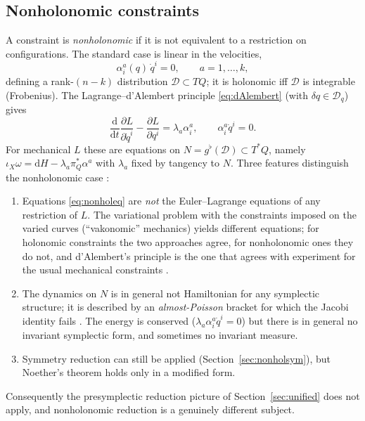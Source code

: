 \documentclass[11pt,a4paper]{article}
\numberwithin{equation}{section}
\theoremstyle{plain}
\theoremstyle{definition}
\theoremstyle{remark}
\newcommand{\dd}{\mathrm{d}}
\begin{document}
\subsection{Nonholonomic constraints}\label{sec:nonhol}

A constraint is \emph{nonholonomic} if it is not equivalent to a restriction on configurations. The standard case is linear in the velocities,
\begin{equation}\label{eq:nonhol}
\alpha^a_i(q)\,\dot q^i=0,\qquad a=1,\dots,k,
\end{equation}
defining a rank-$(n-k)$ distribution $\mathcal D\subset TQ$; it is holonomic iff $\mathcal D$ is integrable (Frobenius). The Lagrange--d'Alembert principle \eqref{eq:dAlembert} (with $\delta q\in\mathcal D_q$) gives
\begin{equation}\label{eq:nonholeq}
\frac{\dd}{\dd t}\frac{\partial L}{\partial\dot q^i}-\frac{\partial L}{\partial q^i}=\lambda_a\alpha^a_i,\qquad \alpha^a_i\dot q^i=0 .
\end{equation}
For mechanical $L$ these are equations on $N=g^\flat(\mathcal D)\subset T^*Q$, namely $\iota_X\omega=\dd H-\lambda_a\pi_Q^*\alpha^a$ with $\lambda_a$ fixed by tangency to $N$. Three features distinguish the nonholonomic case \cite{akn,bloch2003,cortes2002,bkmm1996}:
\begin{enumerate}[label=(\alph*)]
\item Equations \eqref{eq:nonholeq} are \emph{not} the Euler--Lagrange equations of any restriction of $L$. The variational problem with the constraints imposed on the varied curves (``vakonomic'' mechanics) yields different equations; for holonomic constraints the two approaches agree, for nonholonomic ones they do not, and d'Alembert's principle is the one that agrees with experiment for the usual mechanical constraints \cite{akn}.
\item The dynamics on $N$ is in general not Hamiltonian for any symplectic structure; it is described by an \emph{almost-Poisson} bracket for which the Jacobi identity fails \cite{vanderschaft1994}. The energy is conserved ($\lambda_a\alpha^a_i\dot q^i=0$) but there is in general no invariant symplectic form, and sometimes no invariant measure.
\item Symmetry reduction can still be applied (Section~\ref{sec:nonholsym}), but Noether's theorem holds only in a modified form.
\end{enumerate}
Consequently the presymplectic reduction picture of Section~\ref{sec:unified} does not apply, and nonholonomic reduction is a genuinely different subject.
\end{document}
